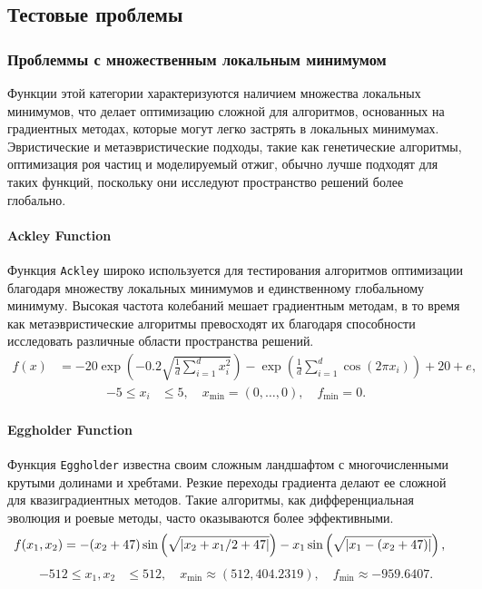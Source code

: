 \documentclass[10pt]{article}
\begin{document}
\subsection{Тестовые проблемы}
\subsubsection{Проблеммы с множественным локальным минимумом}
Функции этой категории характеризуются наличием множества локальных минимумов, что делает оптимизацию сложной для алгоритмов, основанных на градиентных методах, которые могут легко застрять в локальных минимумах. Эвристические и метаэвристические подходы, такие как генетические алгоритмы, оптимизация роя частиц и моделируемый отжиг, обычно лучше подходят для таких функций, поскольку они исследуют пространство решений более глобально.
\paragraph{Ackley Function}
Функция \texttt{Ackley} широко используется для тестирования алгоритмов оптимизации благодаря множеству локальных минимумов и единственному глобальному минимуму. Высокая частота колебаний мешает градиентным методам, в то время как метаэвристические алгоритмы превосходят их благодаря способности исследовать различные области пространства решений.
\begin{align}
    f(x) &= -20 \exp\left(-0.2 \sqrt{\frac{1}{d} \sum_{i=1}^d x_i^2}\right) - \exp\left(\frac{1}{d} \sum_{i=1}^d \cos(2 \pi x_i)\right) + 20 + e,
    \label{eq:ackley}
\end{align}
\begin{align*}
    -5 \leq x_i &\leq 5, \quad x_{\text{min}} = (0, \ldots, 0), \quad f_{\text{min}} = 0.
\end{align*}

\paragraph{Eggholder Function}
Функция \texttt{Eggholder} известна своим сложным ландшафтом с многочисленными крутыми долинами и хребтами. Резкие переходы градиента делают ее сложной для квазиградиентных методов. Такие алгоритмы, как дифференциальная эволюция и роевые методы, часто оказываются более эффективными.
\begin{align}
    f(x_1, x_2) &= -(x_2 + 47) \sin\left(\sqrt{|x_2 + x_1/2 + 47|}\right) - x_1 \sin\left(\sqrt{|x_1 - (x_2 + 47)|}\right),
    \label{{eq:egg}}
\end{align}
\begin{align*}
    -512 \leq x_1, x_2 &\leq 512, \quad x_{\text{min}} \approx (512, 404.2319), \quad f_{\text{min}} \approx -959.6407.
\end{align*}
\end{document}
